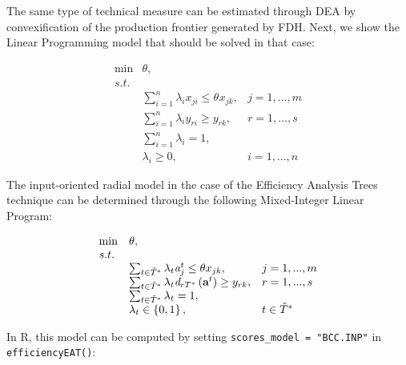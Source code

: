 The same type of technical measure can be estimated through DEA by
convexification of the production frontier generated by FDH. Next, we
show the Linear Programming model that should be solved in that case:

\begin{equation} \label{(16)} 
\begin{array}{lllll}  
{} & {\min } & {\theta, } & {} & {}  \\ 
{} & {s.t.} & {} & {} & {} \\ 
{} & {} & {\sum_{i=1}^{n}\lambda_{i} x_{ji}  \le \theta_{} x_{jk} ,} & {j=1,...,m} & {} \\ 
{} & {} & {\sum_{i=1}^{n}\lambda_{i} y_{ri}  \ge y_{rk} ,} & {r=1,...,s} & {} \\ 
{} & {} & {\sum_{i=1}^{n}\lambda_{i}  =1,} & {} & {} \\ 
{} & {} & {\lambda _{i} \ge 0,} & {i=1,...,n} & {} 
\end{array} 
\end{equation}

The input-oriented radial model in the case of the Efficiency Analysis
Trees technique can be determined through the following Mixed-Integer
Linear Program:

\begin{equation} \label{(17)} 
\begin{array}{lllll} 
{} & {\min } & {\theta,} & {} & {}  \\ 
{} & {s.t.} & {} & {} & {} \\ 
{} & {} & {\sum_{t\in \tilde{T}^{*} }^{}\lambda_{t} {\it a}_{j}^{t}  \le \theta x_{jk} ,} & {j=1,...,m} & {} \\ 
{} & {} & {\sum_{t\in \tilde{T}^{*} }^{}\lambda_{t} {\it d}_{rT^{*}} \left({\it \textbf{a}}^{t} \right) \ge y_{rk} ,} & {r=1,...,s} & {} \\ 
{} & {} & {\sum_{t\in \tilde{T}^{*} }^{}\lambda _{t}  =1,} & {} & {} \\ 
{} & {} & {\lambda _{t} \in \left\{0,1\right\},} & {t\in \tilde{T}^{*} } & {} 
\end{array} 
\end{equation}

In R, this model can be computed by setting
\texttt{scores\_model\ =\ "BCC.INP"} in \texttt{efficiencyEAT()}:

